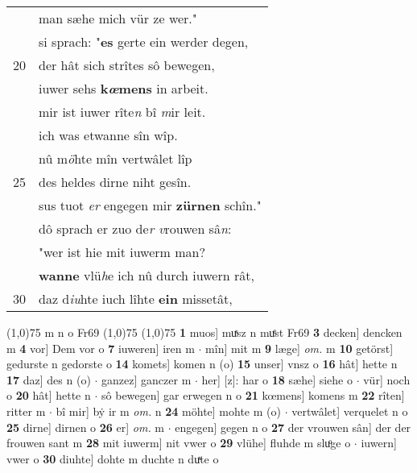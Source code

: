 \documentclass[8pt,a4paper,notitlepage]{article}
\begin{document}
\begin{table}[ht]
\begin{minipage}[t]{0.5\linewidth}
\begin{tabular}{rl}
 & man sæhe mich vür ze wer."\\ 
 & si sprach: "\textbf{es} gerte ein werder degen,\\ 
20 & der hât sich strîtes sô bewegen,\\ 
 & iuwer sehs \textbf{k\textit{œ}mens} in arbeit.\\ 
 & mir ist iuwer rîte\textit{n} bî \textit{m}ir leit.\\ 
 & ich was etwanne sîn wîp.\\ 
 & nû m\textit{ö}hte mîn vertwâlet lîp\\ 
25 & des heldes dirne niht gesîn.\\ 
 & sus tuot \textit{er} engegen mir \textbf{zürnen} schîn."\\ 
 & dô sprach er zuo de\textit{r v}rouwen sâ\textit{n}:\\ 
 & "wer ist hie mit iuwerm man?\\ 
 & \textbf{wanne} vlü\textit{h}e ich nû durch iuwern rât,\\ 
30 & daz d\textit{iu}hte iuch lîhte \textbf{ein} missetât,\\ 
\end{tabular}
\scriptsize
\line(1,0){75} \newline
m n o Fr69 \newline
\line(1,0){75} \newline
\newline
\line(1,0){75} \newline
\textbf{1} muos] muͯsz n muͤst Fr69 \textbf{3} decken] dencken m \textbf{4} vor] Dem vor o \textbf{7} iuweren] iren m  $\cdot$ mîn] mit m \textbf{9} læge] \textit{om.} m \textbf{10} getörst] gedurste n gedorste o \textbf{14} komets] komen n (o) \textbf{15} unser] vnsz o \textbf{16} hât] hette n \textbf{17} daz] des n (o)  $\cdot$ ganzez] ganczer m  $\cdot$ her] [z]: har o \textbf{18} sæhe] siehe o  $\cdot$ vür] noch o \textbf{20} hât] hette n  $\cdot$ sô bewegen] gar erwegen n o \textbf{21} kœmens] komens m \textbf{22} rîten] ritter m  $\cdot$ bî mir] bẏ ir m \textit{om.} n \textbf{24} möhte] mohte m (o)  $\cdot$ vertwâlet] verquelet n o \textbf{25} dirne] dirnen o \textbf{26} er] \textit{om.} m  $\cdot$ engegen] gegen n o \textbf{27} der vrouwen sân] der der frouwen sant m \textbf{28} mit iuwerm] nit vwer o \textbf{29} vlühe] fluhde m sluͦge o  $\cdot$ iuwern] vwer o \textbf{30} diuhte] dohte m duchte n duͯte o \newline
\end{minipage}
\end{table}
\newpage
\end{document}
